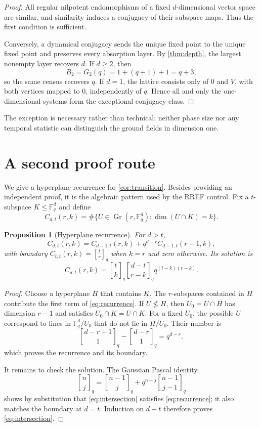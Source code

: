 \documentclass[11pt,a4paper]{amsart}
\newcommand{\F}{\mathbb F}
\newcommand{\Gr}{\operatorname{Gr}}
\newcommand{\qbinom}[2]{\genfrac{[}{]}{0pt}{}{#1}{#2}_{q}}
\newtheorem{proposition}[theorem]{Proposition}
\begin{document}
\begin{proof}
All regular nilpotent endomorphisms of a fixed $d$-dimensional vector space
are similar, and similarity induces a conjugacy of their subspace maps.
Thus the first condition is sufficient.

Conversely, a dynamical conjugacy sends the unique fixed point to the unique
fixed point and preserves every absorption layer.  By \cref{thm:depth}, the
largest nonempty layer recovers $d$.  If $d\geq2$, then
\[
 B_2=G_2(q)=1+(q+1)+1=q+3,
\]
so the same census recovers $q$.  If $d=1$, the lattice consists only of
$0$ and $V$, with both vertices mapped to $0$, independently of $q$.
Hence all and only the one-dimensional systems form the exceptional
conjugacy class.
\end{proof}

The exception is necessary rather than technical: neither phase size nor
any temporal statistic can distinguish the ground fields in dimension one.

\section{A second proof route}

We give a hyperplane recurrence for \cref{cor:transition}.  Besides providing
an independent proof, it is the algebraic pattern used by the RREF control.
Fix a $t$-subspace $K\leq\F_q^d$ and define
\[
 C_{d,t}(r,k)
 =\#\{U\in\Gr(r,\F_q^d):\dim(U\cap K)=k\}.
\]

\begin{proposition}[Hyperplane recurrence]
\label{prop:recurrence}
For $d>t$,
\begin{equation}
 \label{eq:recurrence}
 C_{d,t}(r,k)
 =C_{d-1,t}(r,k)+q^{d-r}C_{d-1,t}(r-1,k),
\end{equation}
with boundary
$C_{t,t}(r,k)=\qbinom{t}{r}$ when $k=r$ and zero otherwise.  Its solution is
\begin{equation}
 \label{eq:intersection}
 C_{d,t}(r,k)
 =\qbinom{t}{k}\qbinom{d-t}{r-k}q^{(t-k)(r-k)}.
\end{equation}
\end{proposition}

\begin{proof}
Choose a hyperplane $H$ that contains $K$.  The $r$-subspaces contained in
$H$ contribute the first term of \eqref{eq:recurrence}.  If $U\nleq H$, then
$U_0=U\cap H$ has dimension $r-1$ and satisfies
$U_0\cap K=U\cap K$.  For a fixed $U_0$, the possible $U$ correspond to
lines in $\F_q^d/U_0$ that do not lie in $H/U_0$.  Their number is
\[
 \qbinom{d-r+1}{1}-\qbinom{d-r}{1}=q^{d-r},
\]
which proves the recurrence and its boundary.

It remains to check the solution.  The Gaussian Pascal identity
\[
 \qbinom{n}{j}
 =\qbinom{n-1}{j}+q^{n-j}\qbinom{n-1}{j-1}
\]
shows by substitution that \eqref{eq:intersection} satisfies
\eqref{eq:recurrence}; it also matches the boundary at $d=t$.  Induction on
$d-t$ therefore proves \eqref{eq:intersection}.
\end{proof}
\end{document}
